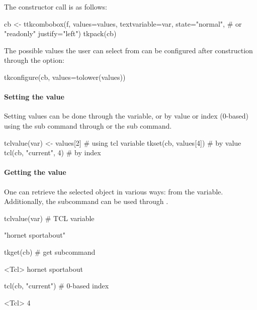 The constructor call is as follows:
\begin{Schunk}
\begin{Sinput}
 cb <- ttkcombobox(f,
                   values=values,
                   textvariable=var,
                   state="normal", # or "readonly"
                   justify="left")
 tkpack(cb)
\end{Sinput}
\end{Schunk}


The possible values the user can select from can be configured after
construction through the  option:
\begin{Schunk}
\begin{Sinput}
 tkconfigure(cb, values=tolower(values))
\end{Sinput}
\end{Schunk}


\paragraph{Setting the value}
Setting values can be done through the \TCL\/ variable, or by value or
index (0-based) using the  sub command
through  or the  sub
command.

\begin{Schunk}
\begin{Sinput}
 tclvalue(var) <- values[2]            # using tcl variable
 tkset(cb, values[4])                  # by value
 tcl(cb, "current", 4)                 # by index
\end{Sinput}
\end{Schunk}


\paragraph{Getting the value}
One can retrieve the selected object in various ways: from the \TCL\/
variable. Additionally, the  subcommand
can be used through .

\begin{Schunk}
\begin{Sinput}
 tclvalue(var)                           # TCL variable
\end{Sinput}
\begin{Soutput}
[1] "hornet sportabout"
\end{Soutput}
\begin{Sinput}
 tkget(cb)                               # get subcommand
\end{Sinput}
\begin{Soutput}
<Tcl> hornet sportabout 
\end{Soutput}
\begin{Sinput}
 tcl(cb, "current")                      # 0-based index
\end{Sinput}
\begin{Soutput}
<Tcl> 4 
\end{Soutput}
\end{Schunk}


